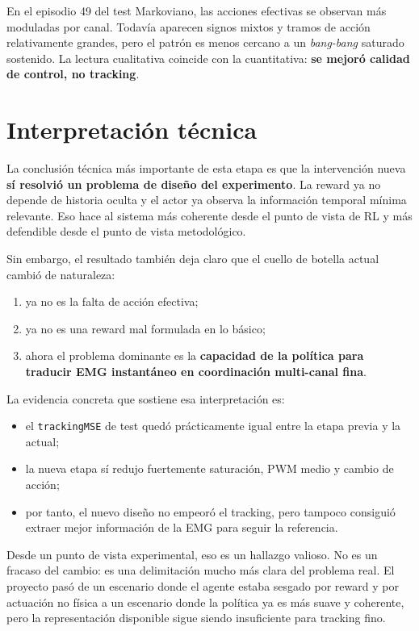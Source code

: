 \documentclass[11pt,a4paper]{article}
\begin{document}
En el episodio 49 del test Markoviano, las acciones efectivas se observan m\'as moduladas por canal. Todav\'ia aparecen signos mixtos y tramos de acci\'on relativamente grandes, pero el patr\'on es menos cercano a un \emph{bang-bang} saturado sostenido. La lectura cualitativa coincide con la cuantitativa: \textbf{se mejor\'o calidad de control, no tracking}.

\section{Interpretaci\'on t\'ecnica}

La conclusi\'on t\'ecnica m\'as importante de esta etapa es que la intervenci\'on nueva \textbf{s\'i resolvi\'o un problema de dise\~no del experimento}. La reward ya no depende de historia oculta y el actor ya observa la informaci\'on temporal m\'inima relevante. Eso hace al sistema m\'as coherente desde el punto de vista de RL y m\'as defendible desde el punto de vista metodol\'ogico.

Sin embargo, el resultado tambi\'en deja claro que el cuello de botella actual cambi\'o de naturaleza:
\begin{enumerate}[leftmargin=1.2cm]
    \item ya no es la falta de acci\'on efectiva;
    \item ya no es una reward mal formulada en lo b\'asico;
    \item ahora el problema dominante es la \textbf{capacidad de la pol\'itica para traducir EMG instant\'aneo en coordinaci\'on multi-canal fina}.
\end{enumerate}

La evidencia concreta que sostiene esa interpretaci\'on es:
\begin{itemize}[leftmargin=1.2cm]
    \item el \texttt{trackingMSE} de test qued\'o pr\'acticamente igual entre la etapa previa y la actual;
    \item la nueva etapa s\'i redujo fuertemente saturaci\'on, PWM medio y cambio de acci\'on;
    \item por tanto, el nuevo dise\~no no empeor\'o el tracking, pero tampoco consigui\'o extraer mejor informaci\'on de la EMG para seguir la referencia.
\end{itemize}

Desde un punto de vista experimental, eso es un hallazgo valioso. No es un fracaso del cambio: es una delimitaci\'on mucho m\'as clara del problema real. El proyecto pas\'o de un escenario donde el agente estaba sesgado por reward y por actuaci\'on no f\'isica a un escenario donde la pol\'itica ya es m\'as suave y coherente, pero la representaci\'on disponible sigue siendo insuficiente para tracking fino.
\end{document}
